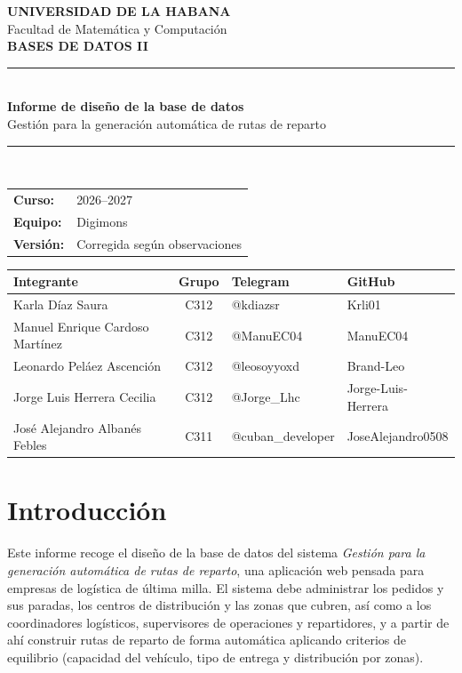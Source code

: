 \documentclass[11pt,a4paper]{article}
\begin{document}
\begin{titlepage}
\thispagestyle{empty}
\begin{center}
\vspace*{0.6cm}
{\Large \textbf{UNIVERSIDAD DE LA HABANA}}\\[0.3cm]
{\large Facultad de Matemática y Computación}\\[1.4cm]
{\Large \textbf{BASES DE DATOS II}}\\[1.3cm]
{\rule{\textwidth}{1pt}}\\[0.5cm]
{\huge \textbf{Informe de diseño de la base de datos}}\\[0.45cm]
{\Large Gestión para la generación automática de rutas de reparto}\\[0.5cm]
{\rule{\textwidth}{1pt}}\\[1.8cm]
\begin{tabular}{ll}
\textbf{Curso:} & 2026--2027 \\
\textbf{Equipo:} & Digimons \\
\textbf{Versión:} & Corregida según observaciones
\end{tabular}
\vfill
\begin{tabular}{>{\raggedright\arraybackslash}p{6.3cm}c p{3.1cm} p{3.6cm}}
\toprule
\textbf{Integrante} & \textbf{Grupo} & \textbf{Telegram} & \textbf{GitHub}\\
\midrule
Karla Díaz Saura & C312 & @kdiazsr & Krli01\\
Manuel Enrique Cardoso Martínez & C312 & @ManuEC04 & ManuEC04\\
Leonardo Peláez Ascención & C312 & @leosoyyoxd & Brand-Leo\\
Jorge Luis Herrera Cecilia & C312 & @Jorge\_Lhc & Jorge-Luis-Herrera\\
José Alejandro Albanés Febles & C311 & @cuban\_developer & JoseAlejandro0508\\
\bottomrule
\end{tabular}
\vfill
\end{center}
\end{titlepage}

\tableofcontents
\newpage

\section{Introducción}

Este informe recoge el diseño de la base de datos del sistema \textit{Gestión para la generación automática de rutas de reparto}, una aplicación web pensada para empresas de logística de última milla. El sistema debe administrar los pedidos y sus paradas, los centros de distribución y las zonas que cubren, así como a los coordinadores logísticos, supervisores de operaciones y repartidores, y a partir de ahí construir rutas de reparto de forma automática aplicando criterios de equilibrio (capacidad del vehículo, tipo de entrega y distribución por zonas).
\end{document}
